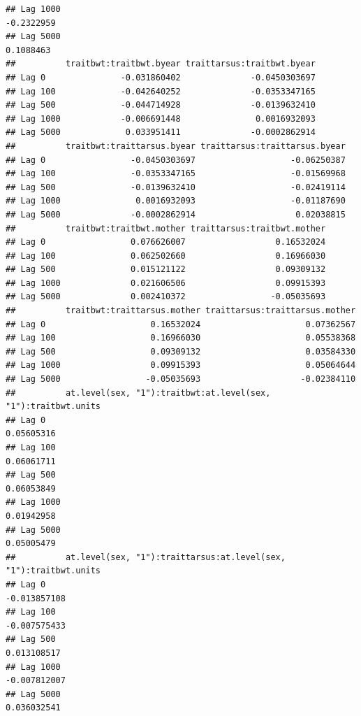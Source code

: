 \documentclass[
  12pt,
]{book}
\begin{document}
\begin{verbatim}
## Lag 1000                                                           -0.2322959
## Lag 5000                                                            0.1088463
##          traitbwt:traitbwt.byear traittarsus:traitbwt.byear
## Lag 0               -0.031860402              -0.0450303697
## Lag 100             -0.042640252              -0.0353347165
## Lag 500             -0.044714928              -0.0139632410
## Lag 1000            -0.006691448               0.0016932093
## Lag 5000             0.033951411              -0.0002862914
##          traitbwt:traittarsus.byear traittarsus:traittarsus.byear
## Lag 0                 -0.0450303697                   -0.06250387
## Lag 100               -0.0353347165                   -0.01569968
## Lag 500               -0.0139632410                   -0.02419114
## Lag 1000               0.0016932093                   -0.01187690
## Lag 5000              -0.0002862914                    0.02038815
##          traitbwt:traitbwt.mother traittarsus:traitbwt.mother
## Lag 0                 0.076626007                  0.16532024
## Lag 100               0.062502660                  0.16966030
## Lag 500               0.015121122                  0.09309132
## Lag 1000              0.021606506                  0.09915393
## Lag 5000              0.002410372                 -0.05035693
##          traitbwt:traittarsus.mother traittarsus:traittarsus.mother
## Lag 0                     0.16532024                     0.07362567
## Lag 100                   0.16966030                     0.05538368
## Lag 500                   0.09309132                     0.03584330
## Lag 1000                  0.09915393                     0.05064644
## Lag 5000                 -0.05035693                    -0.02384110
##          at.level(sex, "1"):traitbwt:at.level(sex, "1"):traitbwt.units
## Lag 0                                                       0.05605316
## Lag 100                                                     0.06061711
## Lag 500                                                     0.06053849
## Lag 1000                                                    0.01942958
## Lag 5000                                                    0.05005479
##          at.level(sex, "1"):traittarsus:at.level(sex, "1"):traitbwt.units
## Lag 0                                                        -0.013857108
## Lag 100                                                      -0.007575433
## Lag 500                                                       0.013108517
## Lag 1000                                                     -0.007812007
## Lag 5000                                                      0.036032541

\end{verbatim}
\end{document}
